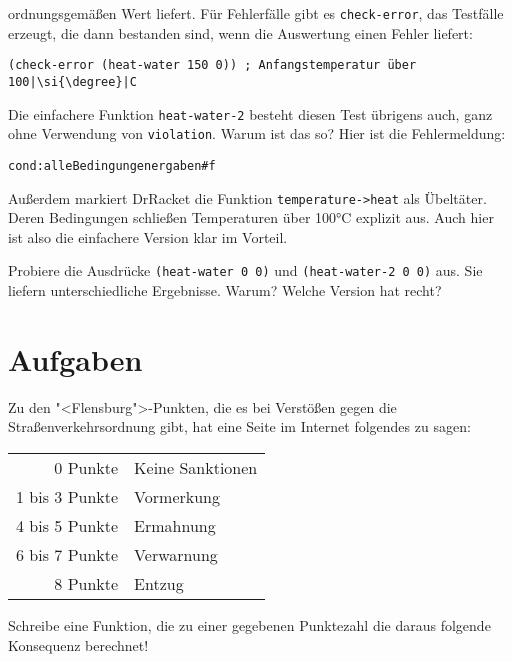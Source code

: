 ordnungsgemäßen Wert liefert.  Für Fehlerfälle gibt es
\lstinline{check-error}, das Testfälle erzeugt, die dann bestanden sind,
wenn die Auswertung einen Fehler liefert:
%
\begin{lstlisting}
(check-error (heat-water 150 0)) ; Anfangstemperatur über 100|\si{\degree}|C
\end{lstlisting}
%
Die einfachere Funktion \lstinline{heat-water-2} besteht diesen Test
übrigens auch, ganz ohne Verwendung von \lstinline{violation}.  Warum ist das so?
Hier ist die Fehlermeldung:
%
\begin{alltt}
{\color{red}cond: alle Bedingungen ergaben #f}
\end{alltt}
%
Außerdem markiert DrRacket die Funktion \lstinline{temperature->heat}
als Übeltäter.  Deren Bedingungen schließen Temperaturen über 100\si{\degree}C
explizit aus.  Auch hier ist also die einfachere Version klar im
Vorteil.

\begin{aufgabeinline}
  Probiere die Ausdrücke \lstinline{(heat-water 0 0)} und
  \lstinline{(heat-water-2 0 0)} aus.  Sie liefern unterschiedliche
  Ergebnisse.  Warum?  Welche Version hat recht?
\end{aufgabeinline}

\section*{Aufgaben}

\begin{aufgabe}
Zu den "<Flensburg">-Punkten, die es bei Verstößen gegen die
Straßenverkehrsordnung gibt, hat eine Seite im Internet folgendes zu
sagen:
%
\begin{center}
  \begin{tabular}{rl}
    0 Punkte & Keine Sanktionen\\
    1 bis 3 Punkte & Vormerkung\\
    4 bis 5 Punkte & Ermahnung\\
    6 bis 7 Punkte & Verwarnung\\
    8 Punkte & Entzug
  \end{tabular}
\end{center}
%
Schreibe eine Funktion, die zu einer gegebenen Punktezahl die daraus
folgende Konsequenz berechnet!
\end{aufgabe}

